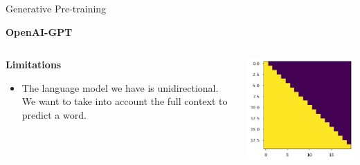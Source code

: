 \documentclass[aspectratio=169]{beamer}
\begin{document}
\begin{frame}{Generative Pre-training}
\centering

\textbf{OpenAI-GPT \cite{radford2018improving}}

\begin{columns}
\begin{column}{0.5\textwidth}
\textbf{Limitations}
\begin{itemize}
	\item The language model we have is unidirectional. We want to take into account the full context to predict a word.
\end{itemize}
   
\end{column}
\begin{column}{0.5\textwidth}  %
    \centering

\includegraphics[width=\textwidth]{figures/masked_multihead_attn}

\end{column}
\end{columns}

\end{frame}
\end{document}
